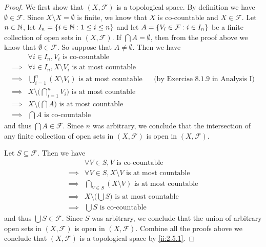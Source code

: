\begin{proof}
  We first show that \((X, \mathcal{F})\) is a topological space.
  By definition we have \(\emptyset \in \mathcal{F}\).
  Since \(X \setminus X = \emptyset\) is finite, we know that \(X\) is co-countable and \(X \in \mathcal{F}\).
  Let \(n \in \mathbb{N}\), let \(I_n = \left\lbrace i \in \mathbb{N} : 1 \leq i \leq n\right\rbrace\) and let \(A = \left\lbrace V_i \in \mathcal{F} : i \in I_n\right\rbrace\) be a finite collection of open sets in \((X, \mathcal{F})\).
  If \(\bigcap A = \emptyset\), then from the proof above we know that \(\emptyset \in \mathcal{F}\).
  So suppose that \(A \neq \emptyset\).
  Then we have
  \begin{align*}
             & \forall i \in I_n, V_i \text{ is co-countable}                                                                           \\
    \implies & \forall i \in I_n, X \setminus V_i \text{ is at most countable}                                                          \\
    \implies & \bigcup_{i = 1}^n (X \setminus V_i) \text{ is at most countable}           &  & \text{(by Exercise 8.1.9 in Analysis I)} \\
    \implies & X \setminus \bigg(\bigcap_{i = 1}^n V_i\bigg) \text{ is at most countable}                                               \\
    \implies & X \setminus \bigg(\bigcap A\bigg) \text{ is at most countable}                                                           \\
    \implies & \bigcap A \text{ is co-countable}
  \end{align*}
  and thus \(\bigcap A \in \mathcal{F}\).
  Since \(n\) was arbitrary, we conclude that the intersection of any finite collection of open sets in \((X, \mathcal{F})\) is open in \((X, \mathcal{F})\).

  Let \(S \subseteq \mathcal{F}\).
  Then we have
  \begin{align*}
             & \forall V \in S, V \text{ is co-countable}                     \\
    \implies & \forall V \in S, X \setminus V \text{ is at most countable}    \\
    \implies & \bigcap_{V \in S} (X \setminus V) \text{ is at most countable} \\
    \implies & X \setminus \bigg(\bigcup S\bigg) \text{ is at most countable} \\
    \implies & \bigcup S \text{ is co-countable}
  \end{align*}
  and thus \(\bigcup S \in \mathcal{F}\).
  Since \(S\) was arbitrary, we conclude that the union of arbitrary open sets in \((X, \mathcal{F})\) is open in \((X, \mathcal{F})\).
  Combine all the proofs above we conclude that \((X, \mathcal{F})\) is a topological space by \cref{ii:2.5.1}.


\end{proof}
